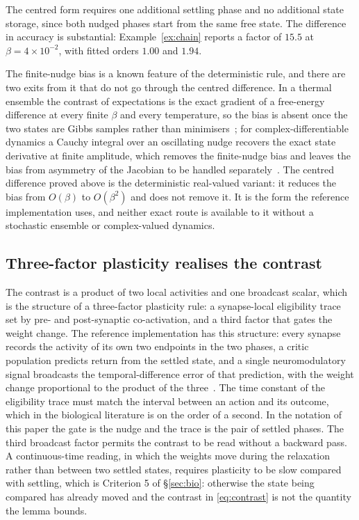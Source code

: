 \documentclass[11pt]{article}
\theoremstyle{definition}
\theoremstyle{remark}
\begin{document}
The centred form requires one additional settling phase and no additional state storage, since both
nudged phases start from the same free state. The difference in accuracy is substantial:
Example~\ref{ex:chain} reports a factor of $15.5$ at $\beta=4\times10^{-2}$, with fitted orders $1.00$
and $1.94$.

The finite-nudge bias is a known feature of the deterministic rule, and there are two exits from it
that do not go through the centred difference. In a thermal ensemble the contrast of expectations is
the exact gradient of a free-energy difference at every finite $\beta$ and every temperature, so the
bias is absent once the two states are Gibbs samples rather than minimisers~\cite{litman2025}; for
complex-differentiable dynamics a Cauchy integral over an oscillating nudge recovers the exact state
derivative at finite amplitude, which removes the finite-nudge bias and leaves the bias from
asymmetry of the Jacobian to be handled separately~\cite{laborieux2022,laborieux2024}. The centred
difference proved above is the deterministic real-valued variant: it reduces the bias from $O(\beta)$
to $O(\beta^2)$ and does not remove it. It is the form the reference implementation uses, and neither
exact route is available to it without a stochastic ensemble or complex-valued dynamics.

\subsection{Three-factor plasticity realises the contrast}
The contrast is a product of two local activities and one broadcast scalar, which is the structure of a
three-factor plasticity rule: a synapse-local eligibility trace set by pre- and post-synaptic
co-activation, and a third factor that gates the weight change. The reference implementation has this
structure: every synapse records the activity of its own two endpoints in the two phases, a critic
population predicts return from the settled state, and a single neuromodulatory signal broadcasts the
temporal-difference error of that prediction, with the weight change proportional to the product of the
three~\cite{gerstner2018,fremaux2015}. The time constant of the eligibility trace must match the
interval between an action and its outcome, which in the biological literature is on the order of a
second. In the notation of this paper the gate is the nudge and the trace is the pair of settled
phases. The third broadcast factor permits the contrast to be read without a backward pass. A
continuous-time reading, in which the weights move during the relaxation rather than between two
settled states, requires plasticity to be slow compared with settling, which is Criterion 5 of
\S\ref{sec:bio}: otherwise the state being compared has already moved and the contrast in
\eqref{eq:contrast} is not the quantity the lemma bounds.
\end{document}
